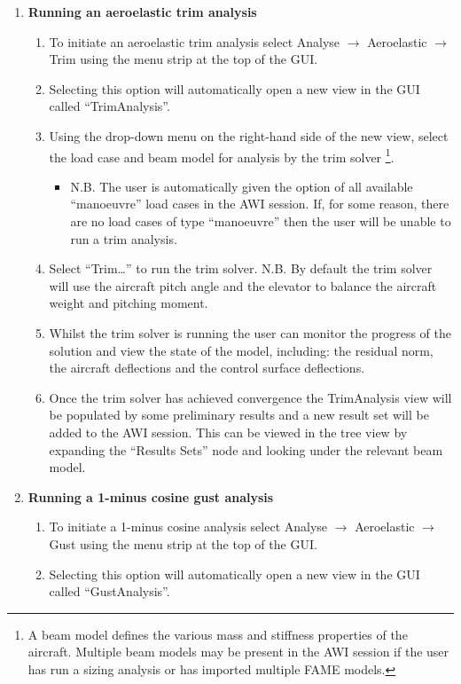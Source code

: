 \begin{enumerate}
\begin{enumerate}
		\item \textbf{Running an aeroelastic trim analysis}
		\begin{enumerate}
			\item To initiate an aeroelastic trim analysis select Analyse $\rightarrow$ Aeroelastic $\rightarrow$ Trim using the menu strip at the top of the GUI.
			\item Selecting this option will automatically open a new view in the GUI called ``TrimAnalysis''. 
			\item Using the drop-down menu on the right-hand side of the new view, select the load case and beam model for analysis by the trim solver \footnote{A beam model defines the various mass and stiffness properties of the aircraft. Multiple beam models may be present in the AWI session if the user has run a sizing analysis or has imported multiple FAME models.}. 
			\begin{itemize}
				\item N.B. The user is automatically given the option of all available ``manoeuvre'' load cases in the AWI session. If, for some reason, there are no load cases of type ``manoeuvre'' then the user will be unable to run a trim analysis.
			\end{itemize}
			\item Select ``Trim…'' to run the trim solver. N.B. By default the trim solver will use the aircraft pitch angle and the elevator to balance the aircraft weight and pitching moment.
			\item Whilst the trim solver is running the user can monitor the progress of the solution and view the state of the model, including: the residual norm, the aircraft deflections and the control surface deflections.
			\item Once the trim solver has achieved convergence the TrimAnalysis view will be populated by some preliminary results and a new result set will be added to the AWI session.  This can be viewed in the tree view by expanding the ``Results Sets'' node and looking under the relevant beam model.
		\end{enumerate}
		\item \textbf{Running a 1-minus cosine gust analysis}
		\begin{enumerate}
			\item To initiate a 1-minus cosine analysis select Analyse $\rightarrow$ Aeroelastic $\rightarrow$ Gust using the menu strip at the top of the GUI.
			\item Selecting this option will automatically open a new view in the GUI called ``GustAnalysis''. 

\end{enumerate}
\end{enumerate}
\end{enumerate}
